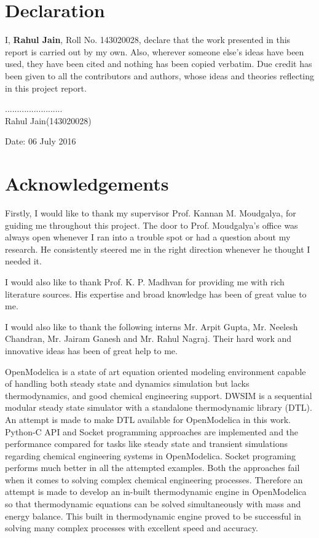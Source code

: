 \documentclass[12pt]{report}
\begin{document}
\newpage

\section*{Declaration}
I, \textbf{Rahul Jain}, Roll No. 143020028, declare that the work presented in this report is carried out by my own. Also, wherever someone else's ideas have been used, they have been cited and nothing has been copied verbatim. Due credit has been given to all the contributors and authors, whose ideas and theories reflecting in this project report. \\
\vspace{3cm}

\begin{flushright}
........................ \\
Rahul Jain(143020028)
\end{flushright}

\vspace{3cm}

\begin{flushleft}
Date: 06 July 2016
\end{flushleft}

\newpage
\section*{Acknowledgements}
Firstly, I would like to thank my supervisor Prof. Kannan M. Moudgalya, for guiding me throughout this project. The door to Prof. Moudgalya's office was always open whenever I ran into a trouble spot or had a question about my research. He consistently steered me in the right direction whenever he thought I needed it.

I would also like to thank Prof. K. P. Madhvan for providing me with rich literature sources. His expertise and broad knowledge has been of great value to me.  

I would also like to thank the following interns Mr. Arpit Gupta, Mr. Neelesh Chandran, Mr. Jairam Ganesh and Mr. Rahul Nagraj. Their hard work and innovative ideas has been of great help to me. 


\abstract
OpenModelica is a state of art equation oriented modeling environment capable of handling both steady state and dynamics simulation but lacks thermodynamics, and good chemical engineering support. DWSIM is a sequential modular steady state simulator with a standalone thermodynamic library (DTL). An attempt is made to make DTL available for OpenModelica in this work. Python-C API and Socket programming approaches are implemented and the performance compared for tasks like steady state and transient simulations regarding chemical engineering systems in OpenModelica. Socket programing performs much better in all the attempted examples. Both the approaches fail when it comes to solving complex chemical engineering processes. Therefore an attempt is made to develop an in-built thermodynamic engine in OpenModelica so that thermodynamic equations can be solved simultaneously with mass and energy balance. This built in thermodynamic engine proved to be successful in solving many complex processes with excellent speed and accuracy. 
\tableofcontents
\listoftables
\listoffigures
\end{document}
